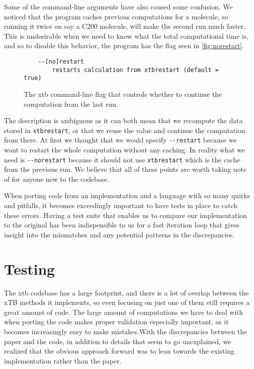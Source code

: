Some of the command-line arguments have also caused some confusion. We noticed that the program caches previous computations for a molecule, so running it twice on say a C200 molecule, will make the second run much faster. This is undesirable when we need to know what the total computational time is, and so to disable this behavior, the program has the flag seen in \autoref{fig:norestart}.
\begin{figure}[H]
\begin{verbatim}
    --[no]restart
        restarts calculation from xtbrestart (default = true)
\end{verbatim}
\caption{The xtb command-line flag that controls whether to continue the computation from the last run.}
\label{fig:norestart}
\end{figure}

The description is ambiguous as it can both mean that we recompute the data stored in \verb|xtbrestart|, or that we reuse the value and continue the computation from there. At first we thought that we would specify \verb|--restart| because we want to restart the whole computation without any caching. In reality what we need is \verb|--norestart| because it should not use \verb|xtbrestart| which is the cache from the previous run. We believe that all of these points are worth taking note of for anyone new to the codebase.

When porting code from an implementation and a language with so many quirks and pitfalls, it becomes exceedingly important to have tests in place to catch these errors. Having a test suite that enables us to compare our implementation to the original has been indispensible to us for a fast iteration loop that gives insight into the mismatches and any potential patterns in the discrepancies.


\section{Testing}\label{sec:testing}

The xtb codebase has a large footprint, and there is a lot of overlap between the xTB methods it implements, so even focusing on just one of them still requires a great amount of code.
The large amount of computations we have to deal with when porting the code makes proper validation especially important, as it becomes increasingly easy to make mistakes.With the discrepancies between the paper and the code, in addition to details that seem to go unexplained, we realized that the obvious approach forward was to lean towards the existing implementation rather than the paper.

